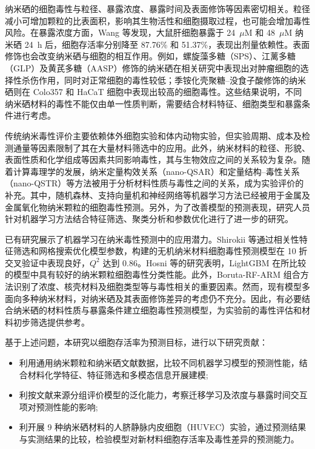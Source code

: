\documentclass[letterpaper]{article}
\begin{document}
纳米硒的细胞毒性与粒径、暴露浓度、暴露时间及表面修饰等因素密切相关。粒径减小可增加颗粒的比表面积，影响其生物活性和细胞摄取过程，也可能会增加毒性风险\cite{zhang2023senpsbio}。在暴露浓度方面，Wang 等\cite{wang2020prooxidation}发现，大鼠肝细胞暴露于 24~$\mu$M 和 48~$\mu$M 纳米硒 24~h 后，细胞存活率分别降至 87.76\% 和 51.37\%，表现出剂量依赖性。表面修饰也会改变纳米硒与细胞的相互作用。例如，螺旋藻多糖（SPS）、江蓠多糖（GLP）及黄芪多糖（AASP）修饰的纳米硒在相关研究中表现出对肿瘤细胞的选择性杀伤作用，同时对正常细胞的毒性较低\cite{zhang2023senpsbio,ji2023astragalus}；季铵化壳聚糖--没食子酸修饰的纳米硒则在 Colo357 和 HaCaT 细胞中表现出较高的细胞毒性\cite{lunkov2023chitosan}。这些结果说明，不同纳米硒材料的毒性不能仅由单一性质判断，需要结合材料特征、细胞类型和暴露条件进行考虑。

传统纳米毒性评价主要依赖体外细胞实验和体内动物实验，但实验周期、成本及检测通量等因素限制了其在大量材料筛选中的应用\cite{ahmadi2024toxicity}。此外，纳米材料的粒径、形貌、表面性质和化学组成等因素共同影响毒性，其与生物效应之间的关系较为复杂\cite{ji2025rosml}。随着计算毒理学的发展，纳米定量构效关系（nano-QSAR）和定量结构--毒性关系（nano-QSTR）等方法被用于分析材料性质与毒性之间的关系，成为实验评价的补充\cite{roy2023tio2}。其中，随机森林、支持向量机和神经网络等机器学习方法已经被用于金属及金属氧化物纳米颗粒的细胞毒性预测\cite{zhang2023qsar}。另外，为了改善模型的预测表现，研究人员针对机器学习方法结合特征筛选、聚类分析和参数优化进行了进一步的研究\cite{sang2022mlcytotoxicity}。

已有研究展示了机器学习在纳米毒性预测中的应用潜力。Shirokii 等通过相关性特征筛选和网格搜索优化模型参数，构建的无机纳米材料细胞毒性预测模型在 10 折交叉验证中表现良好，$Q^2$ 达到 0.86\cite{shirokii2023quantitative}。Hosni 等的研究表明，LightGBM 在所比较的模型中具有较好的纳米颗粒细胞毒性分类性能\cite{hosni2025mlnp}。此外，Boruta-RF-ARM 组合方法识别了浓度、核壳材料及细胞类型等与毒性相关的重要因素\cite{yildirim2025rheumatoid}。然而，现有模型多面向多种纳米材料，对纳米硒及其表面修饰差异的考虑仍不充分。因此，有必要结合纳米硒的材料性质与暴露条件建立细胞毒性预测模型，为实验前的毒性评估和材料初步筛选提供参考。

基于上述问题，本研究以细胞存活率为预测目标，进行以下研究贡献：
\begin{itemize}
\item[1)]利用通用纳米颗粒和纳米硒文献数据，比较不同机器学习模型的预测性能，结合材料化学特征、特征筛选和多模态信息开展建模;
\item[2)]利按文献来源分组评价模型的泛化能力，考察迁移学习及浓度与暴露时间交互项对预测性能的影响;
\item[3)]利开展 9 种纳米硒材料的人脐静脉内皮细胞（HUVEC）实验，通过预测结果与实测结果的比较，检验模型对新材料细胞存活率及毒性差异的预测能力。
\end{itemize}
\end{document}
